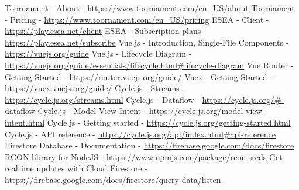 \documentclass[shortabstract]{iithesis}
\theoremstyle{definition} \newtheorem{definition}{Definicja}[]
\theoremstyle{remark} \newtheorem{remark}[definition]{Observation}
\theoremstyle{plain} \newtheorem{theorem}[definition]{Theorem}
\theoremstyle{plain} \newtheorem{lemma}[definition]{Lemma}
\begin{document}

\begin{thebibliography}{1}
     Toornament - About - \url{https://www.toornament.com/en_US/about}
     Toornament - Pricing - \url{https://www.toornament.com/en_US/pricing}
     ESEA - Client - \url{https://play.esea.net/client}
     ESEA - Subscription plans - \url{https://play.esea.net/subscribe}
     Vue.js - Introduction, Single-File Components - \url{https://vuejs.org/guide}
     Vue.js - Lifecycle Diagram - \url{https://vuejs.org/guide/essentials/lifecycle.html#lifecycle-diagram}
     Vue Router - Getting Started - \url{https://router.vuejs.org/guide/}
     Vuex - Getting Started - \url{https://vuex.vuejs.org/guide/}
     Cycle.js - Streams - \url{https://cycle.js.org/streams.html}
     Cycle.js - Dataflow - \url{https://cycle.js.org/#-dataflow}
     Cycle.js - Model-View-Intent - \url{https://cycle.js.org/model-view-intent.html}
     Cycle.js - Getting started - \url{https://cycle.js.org/getting-started.html}
     Cycle.js - API reference - \url{https://cycle.js.org/api/index.html#api-reference}
     Firestore Database - Documentation - \url{https://firebase.google.com/docs/firestore}
     RCON library for NodeJS - \url{https://www.npmjs.com/package/rcon-srcds}
     Get realtime updates with Cloud Firestore - \url{https://firebase.google.com/docs/firestore/query-data/listen}
\end{thebibliography}
\end{document}
